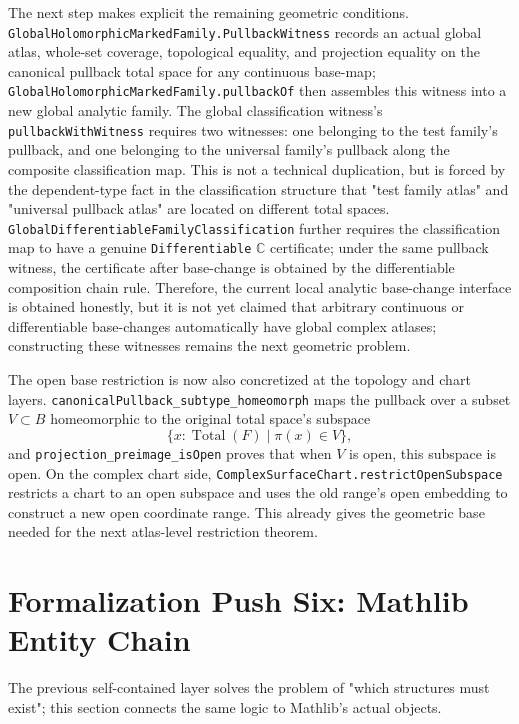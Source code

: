 \documentclass[UTF8,a4paper,11pt]{article}
\begin{document}
\par
The next step makes explicit the remaining geometric conditions.
\texttt{GlobalHolomorphic\allowbreak Marked\allowbreak Family\allowbreak.Pullback\allowbreak Witness} records an actual global atlas, whole-set coverage, topological equality, and projection equality on the canonical pullback total space for any continuous base-map;
\texttt{GlobalHolomorphic\allowbreak Marked\allowbreak Family\allowbreak.pullbackOf} then assembles this witness into a new global analytic family.
The global classification witness's \texttt{pullbackWithWitness} requires two witnesses: one belonging to the test family's pullback, and one belonging to the universal family's pullback along the composite classification map.
This is not a technical duplication, but is forced by the dependent-type fact in the classification structure that "test family atlas" and "universal pullback atlas" are located on different total spaces.
\texttt{GlobalDifferentiable\allowbreak Family\allowbreak Classification} further requires the classification map to have a genuine
\texttt{Differentiable\allowbreak} \(\mathbb C\) certificate; under the same pullback witness, the certificate after base-change is obtained by the differentiable composition chain rule.
Therefore, the current local analytic base-change interface is obtained honestly, but it is not yet claimed that arbitrary continuous or differentiable base-changes automatically have global complex atlases; constructing these witnesses remains the next geometric problem.
\par
The open base restriction is now also concretized at the topology and chart layers. \texttt{canonicalPullback\_subtype\_homeomorph} maps
the pullback over a subset \(V\subset B\) homeomorphic to the original total space's subspace
\[
  \{x:\operatorname{Total}(F)\mid \pi(x)\in V\},
\]
and \texttt{projection\_preimage\_isOpen} proves that when \(V\) is open, this subspace is open.
On the complex chart side, \texttt{ComplexSurfaceChart\allowbreak.restrictOpenSubspace} restricts a chart to an open subspace and uses the old range's open embedding to construct a new open coordinate range. This already gives the geometric base needed for the next atlas-level restriction theorem.

\section{Formalization Push Six: Mathlib Entity Chain}

The previous self-contained layer solves the problem of "which structures must exist"; this section connects the same logic to Mathlib's actual objects.
\end{document}
